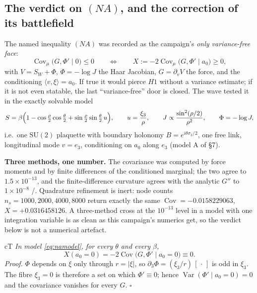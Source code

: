 \subsection{The verdict on $(NA)$, and the correction of its battlefield}

The named inequality $(NA)$ was recorded as the campaign's \emph{only variance-free face}:
\begin{equation}
  \operatorname{Cov}_\mu\bigl(G,\Phi'\mid0\bigr)\le0
  \qquad\Longleftrightarrow\qquad
  X:=-2\operatorname{Cov}_\mu\bigl(G,\Phi'\mid a_0\bigr)\ge0,
  \label{eq:naobj}
\end{equation}
with $V=S_W+\Phi$, $\Phi=-\log J$ the Haar Jacobian, $G=\partial_vV$ the force, and the
conditioning $\langle v,\xi\rangle=a_0$. If true it would pierce $H1$ without a variance estimate;
if it is not even statable, the last ``variance-free'' door is closed. The wave tested it in the
exactly solvable model
\begin{equation}
  S=\beta\Bigl(1-\cos\tfrac{\rho}{2}\cos\tfrac{\theta}{2}
  +\sin\tfrac{\rho}{2}\sin\tfrac{\theta}{2}\,u\Bigr),\qquad u=\frac{\xi_3}{\rho},\qquad
  J\propto\frac{\sin^2(\rho/2)}{\rho^2},\qquad \Phi=-\log J,
  \label{eq:namodel}
\end{equation}
i.e.\ one $\mathrm{SU}(2)$ plaquette with boundary holonomy $B=e^{i\theta\sigma_3/2}$, one free
link, longitudinal mode $v=e_3$, conditioning on $a_0$ along $e_3$ (model A of
 \S7).

\textbf{Three methods, one number.} The covariance was computed by force moments and by finite
differences of the conditioned marginal; the two agree to $1.5\times10^{-13}$, and the
finite-difference curvature agrees with the analytic $G''$ to $1\times10^{-8}$ \LT/\LE. Quadrature
refinement is inert: node counts $n_s=1000,2000,4000,8000$ return exactly the same
$\operatorname{Cov}=-0.0158229063$, $X=+0.0316458126$. A three-method cross at the $10^{-13}$ level
in a model with one integration variable is as clean as this campaign's numerics get, so the
verdict below is not a numerical artefact.

\begin{claimbox}{cT}
 \emph{In model \eqref{eq:namodel}, for every $\theta$
and every $\beta$,}
\[
  X(a_0=0)=-2\operatorname{Cov}\bigl(G,\Phi'\mid a_0=0\bigr)\equiv0 .
\]
\emph{Proof.} $\Phi$ depends on $\xi$ only through $r=\lvert\xi\rvert$, so
$\partial_3\Phi=(\xi_3/r)\,[\,\cdot\,]$ is odd in $\xi_3$. The fibre $\xi_3=0$ is therefore a set on
which $\Phi'\equiv0$; hence $\operatorname{Var}(\Phi'\mid a_0=0)=0$ and the covariance vanishes for
every $G$. $\square$
\end{claimbox}

